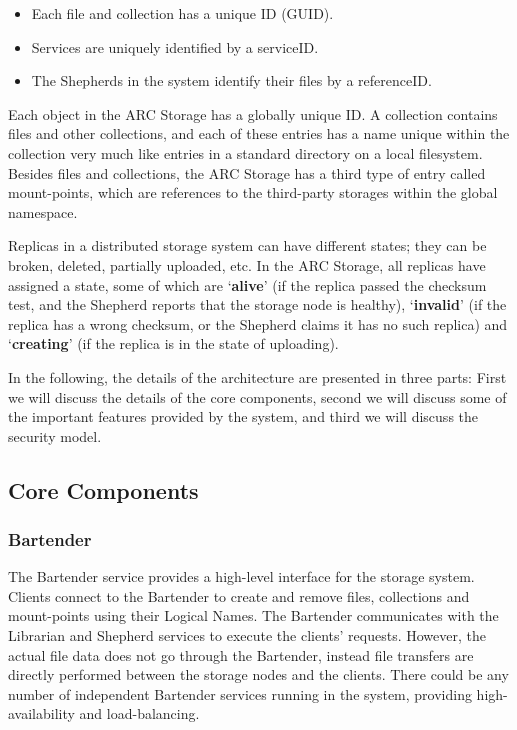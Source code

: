 \documentclass[final]{ieee}
\begin{document}
\begin{itemize} 
\item Each  file and collection has a unique ID (GUID).
\item Services are uniquely identified by a serviceID. 
\item The Shepherds in the system identify their files by a referenceID.
\end{itemize} 

Each object in the ARC Storage has a globally
unique ID. A collection contains files and other collections,
and each of these entries has a name unique within the collection very
much like entries in a standard directory on a local filesystem. Besides
files and collections, the ARC Storage has a third type of entry
called mount-points, which are references to the third-party storages
within the global namespace.

Replicas in a distributed storage system can have different states;
they can be broken, deleted, partially uploaded, etc. In the
ARC Storage, all replicas have assigned a state, some of which are
`\textbf{alive}' (if the replica passed the checksum test, and the
Shepherd reports that the storage node is healthy), `\textbf{invalid}'
(if the replica has a wrong checksum, or the Shepherd claims it has no
such replica) and `\textbf{creating}' (if the replica is in
the state of uploading).

In the following, the details of the
architecture are presented in three parts: First we will discuss the
details of the core components, second we will discuss some of the
important features provided by the system, and third we will discuss the security model.

\subsection{Core Components} 
\subsubsection{Bartender}
\label{Bartender}
The Bartender service provides a high-level interface for the storage
system. Clients connect to the Bartender to create and remove
files, collections and mount-points using their Logical Names. The
Bartender communicates 
with the Librarian and Shepherd services to execute the clients'
requests. However, the actual file data does not go through the
Bartender, instead file
transfers are directly performed between the storage nodes and the
clients. There could be any number of independent Bartender services
running in the system, providing high-availability and
load-balancing. 
\end{document}
